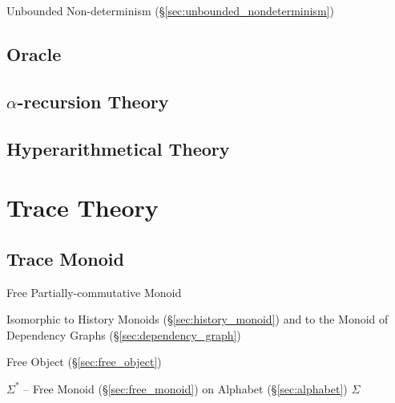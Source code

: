 Unbounded Non-determinism (\S\ref{sec:unbounded_nondeterminism})



\subsection{Oracle}\label{sec:oracle}

\subsection{$\alpha$-recursion Theory}\label{sec:alpha_recursion}

\subsection{Hyperarithmetical Theory}\label{sec:hyperarithmetical_theory}



\section{Trace Theory}\label{sec:trace_theory}

\subsection{Trace Monoid}\label{sec:trace_monoid}

Free Partially-commutative Monoid

Isomorphic to History Monoids (\S\ref{sec:history_monoid}) and to the
Monoid of Dependency Graphs (\S\ref{sec:dependency_graph})

Free Object (\S\ref{sec:free_object})

$\Sigma^*$ -- Free Monoid (\S\ref{sec:free_monoid}) on Alphabet
(\S\ref{sec:alphabet}) $\Sigma$

